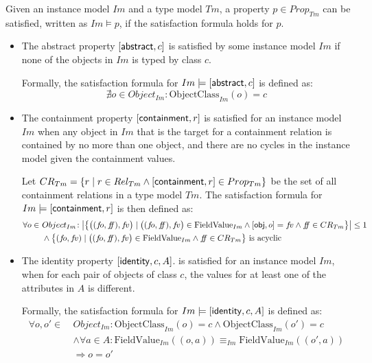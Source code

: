 \begin{defin}
\label{defin:formalisations:ecore_formalisation:instance_models:property_satisfaction}
Given an instance model $Im$ and a type model $Tm$, a property $p \in Prop_{Tm}$ can be satisfied, written
as $Im \models p$, if the satisfaction formula holds for $p$.

\begin{itemize}
    \item The abstract property $[ \mathsf{abstract}, c ]$ is satisfied by some instance model $Im$ if none of the objects in $Im$ is typed by class $c$.
    
    Formally, the satisfaction formula for $Im \models [ \mathsf{abstract}, c ]$ is defined as:
    \begin{equation*}
        \nexists o \in Object_{Im}: \mathrm{ObjectClass}_{Im}(o) = c
    \end{equation*}

    \item The containment property $[ \mathsf{containment}, r ]$ is satisfied for an instance model $Im$ when any object in $Im$ that is the target for a containment relation is contained by no more than one object, and there are no cycles in the instance model given the containment values.
    
    Let $CR_{Tm} = \{r \mid r \in Rel_{Tm} \land [ \mathsf{containment}, r ] \in Prop_{Tm} \}$ be the set of all containment relations in a type model $Tm$. The satisfaction formula for $Im \models [ \mathsf{containment}, r ]$ is then defined as:
    \begin{align*}
        \forall o \in\ &Object_{Im}\!: \big|\big\{ \big( ( f\!o, f\!\!f ), f\!v \big) \mid \big( ( f\!o, f\!\!f ), f\!v \big) \in \mathrm{FieldValue}_{Im} \land [ \type{obj}, o ] = f\!v \land f\!\!f \in CR_{Tm} \big\}\big| \leq 1 \\&
        \land \big\{ (f\!o, f\!v) \mid \big( ( f\!o, f\!\!f ), f\!v \big) \in \mathrm{FieldValue}_{Im} \land f\!\!f \in CR_{Tm} \big\} \text{ is acyclic}
    \end{align*}
    
    \item The identity property $[ \mathsf{identity}, c, A ]$. is satisfied for an instance model $Im$, when for each pair of objects of class $c$, the values for at least one of the attributes in $A$ is different.
    
    Formally, the satisfaction formula for $Im \models [ \mathsf{identity}, c, A ]$ is defined as:
    \begin{align*}
        \forall o, o' \in\ &Object_{Im}\!: \mathrm{ObjectClass}_{Im}(o) = c \land \mathrm{ObjectClass}_{Im}(o') = c \\&\land \forall a \in A\!: \mathrm{FieldValue}_{Im}(( o, a )) \equiv_{Im} \mathrm{FieldValue}_{Im}(( o', a )) \\&\Longrightarrow o = o'
    \end{align*}
    

\end{itemize}
\end{defin}
